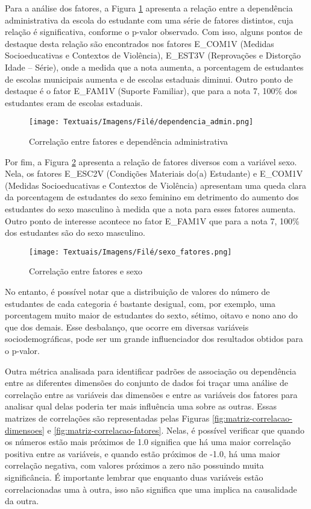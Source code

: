 Para a análise dos fatores, a Figura \ref{fig:fat-dependencia} apresenta a relação entre a dependência administrativa da escola do estudante com uma série de fatores distintos, cuja relação é significativa, conforme o p-valor observado. Com isso, alguns pontos de destaque desta relação são encontrados nos fatores E\_COM1V (Medidas Socioeducativas e Contextos de Violência), E\_EST3V (Reprovações e Distorção Idade – Série), onde a medida que a nota aumenta, a porcentagem de estudantes de escolas municipais aumenta e de escolas estaduais diminui. Outro ponto de destaque é o fator E\_FAM1V (Suporte Familiar), que para a nota 7, 100\% dos estudantes eram de escolas estaduais.


\begin{figure}[ht!]
    \centering
    \caption{Correlação entre fatores e dependência administrativa}
    \texttt{[image: Textuais/Imagens/Filé/dependencia\_admin.png]}
    \label{fig:fat-dependencia}
\end{figure}


Por fim, a Figura \ref{fig:sexo_fatores} apresenta a relação de fatores diversos com a variável sexo. Nela, os fatores E\_ESC2V (Condições Materiais do(a) Estudante) e E\_COM1V (Medidas Socioeducativas e Contextos de Violência) apresentam uma queda clara da porcentagem de estudantes do sexo feminino em detrimento do aumento dos estudantes do sexo masculino à medida que a nota para esses fatores aumenta. Outro ponto de interesse acontece no fator E\_FAM1V que para a nota 7, 100\% dos estudantes são do sexo masculino.


\begin{figure}[ht!]
    \centering
    \caption{Correlação entre fatores e sexo}
    \texttt{[image: Textuais/Imagens/Filé/sexo\_fatores.png]}
    \label{fig:sexo_fatores}
\end{figure}

No entanto, é possível notar que a distribuição de valores do número de estudantes de cada categoria é bastante desigual, com, por exemplo, uma porcentagem muito maior de estudantes do sexto, sétimo, oitavo e nono ano do que dos demais. Esse desbalanço, que ocorre em diversas variáveis sociodemográficas, pode ser um grande influenciador dos resultados obtidos para o p-valor.

Outra métrica analisada para identificar padrões de associação ou dependência entre as diferentes dimensões do conjunto de dados foi traçar uma análise de correlação entre as variáveis das dimensões e entre as variáveis dos fatores para analisar qual delas poderia ter mais influência uma sobre as outras. Essas matrizes de correlações são representadas pelas Figuras \ref{fig:matriz-correlacao-dimensoes} e \ref{fig:matriz-correlacao-fatores}. Nelas, é possível verificar que quando os números estão mais próximos de 1.0 significa que há uma maior correlação positiva entre as variáveis, e quando estão próximos de -1.0, há uma maior correlação negativa, com valores próximos a zero não possuindo muita significância. É importante lembrar que enquanto duas variáveis estão correlacionadas uma à outra, isso não significa que uma implica na causalidade da outra.

